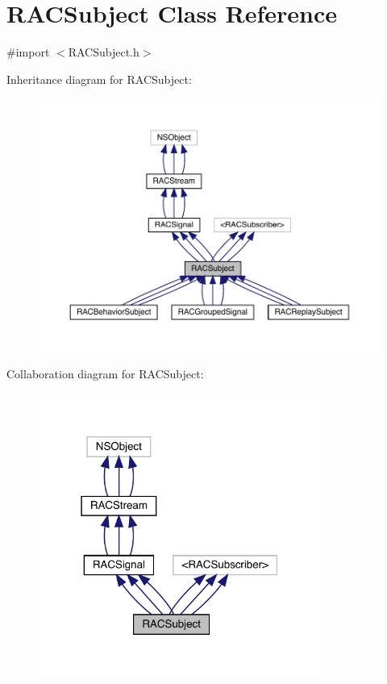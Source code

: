 \hypertarget{interface_r_a_c_subject}{}\section{R\+A\+C\+Subject Class Reference}
\label{interface_r_a_c_subject}


{\ttfamily \#import $<$R\+A\+C\+Subject.\+h$>$}



Inheritance diagram for R\+A\+C\+Subject\+:\nopagebreak
\begin{figure}[H]
\begin{center}
\leavevmode
\includegraphics[width=350pt]{interface_r_a_c_subject__inherit__graph}
\end{center}
\end{figure}


Collaboration diagram for R\+A\+C\+Subject\+:\nopagebreak
\begin{figure}[H]
\begin{center}
\leavevmode
\includegraphics[width=262pt]{interface_r_a_c_subject__coll__graph}
\end{center}
\end{figure}
